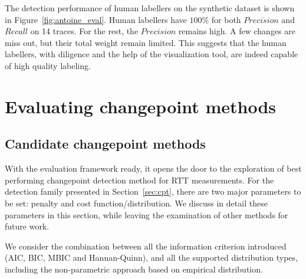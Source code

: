 The detection performance of human labellers on the synthetic dataset is shown in Figure~\ref{fig:antoine_eval}. 
Human labellers have $100\%$ for both $Precision$ and $Recall$ on 14 traces.
For the rest, the $Precision$ remains high. A few changes are miss out, but their total weight remain limited.
This suggests that the human labellers, with diligence and the help of the visualization tool, are indeed capable
of high quality labeling.

\section{Evaluating changepoint methods}
\subsection{Candidate changepoint methods}
\label{sec:method}
With the evaluation framework ready, it opens the door to the exploration of best performing changepoint detection method for RTT measurements.
For the detection family presented in Section~\ref{sec:cpt}, there are two major parameters to be set: penalty and cost function/distribution.
We discuss in detail these parameters in this section, while leaving the examination of other methods for future work.

We consider the combination between all the information criterion introduced (AIC, BIC, MBIC and Hannan-Quinn), and all the supported distribution types, including the non-parametric approach based on empirical distribution.

